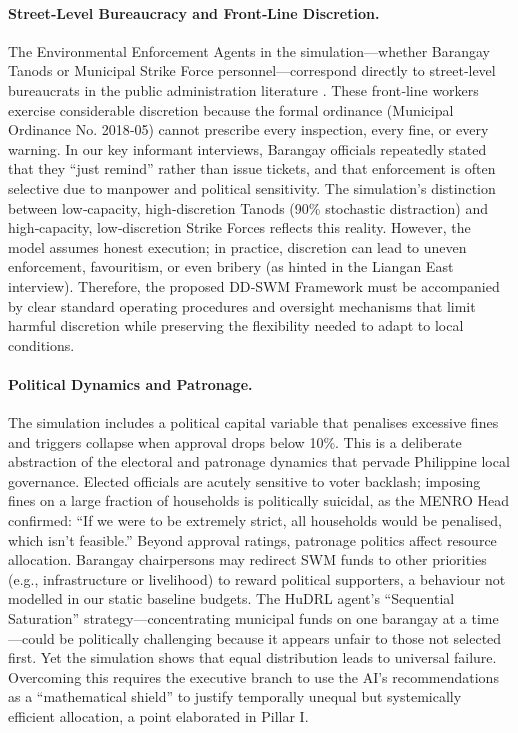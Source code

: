 \paragraph{Street‑Level Bureaucracy and Front‑Line Discretion.}
The Environmental Enforcement Agents in the simulation—whether Barangay Tanods or Municipal Strike Force personnel—correspond directly to street‑level bureaucrats in the public administration literature \citep{Lipsky1980}. These front‑line workers exercise considerable discretion because the formal ordinance (Municipal Ordinance No. 2018‑05) cannot prescribe every inspection, every fine, or every warning. In our key informant interviews, Barangay officials repeatedly stated that they “just remind” rather than issue tickets, and that enforcement is often selective due to manpower and political sensitivity. The simulation’s distinction between low‑capacity, high‑discretion Tanods (90\% stochastic distraction) and high‑capacity, low‑discretion Strike Forces reflects this reality. However, the model assumes honest execution; in practice, discretion can lead to uneven enforcement, favouritism, or even bribery (as hinted in the Liangan East interview). Therefore, the proposed DD‑SWM Framework must be accompanied by clear standard operating procedures and oversight mechanisms that limit harmful discretion while preserving the flexibility needed to adapt to local conditions.

\paragraph{Political Dynamics and Patronage.}
The simulation includes a political capital variable that penalises excessive fines and triggers collapse when approval drops below 10\%. This is a deliberate abstraction of the electoral and patronage dynamics that pervade Philippine local governance. Elected officials are acutely sensitive to voter backlash; imposing fines on a large fraction of households is politically suicidal, as the MENRO Head confirmed: “If we were to be extremely strict, all households would be penalised, which isn’t feasible.” Beyond approval ratings, patronage politics affect resource allocation. Barangay chairpersons may redirect SWM funds to other priorities (e.g., infrastructure or livelihood) to reward political supporters, a behaviour not modelled in our static baseline budgets. The HuDRL agent’s “Sequential Saturation” strategy—concentrating municipal funds on one barangay at a time—could be politically challenging because it appears unfair to those not selected first. Yet the simulation shows that equal distribution leads to universal failure. Overcoming this requires the executive branch to use the AI’s recommendations as a “mathematical shield” to justify temporally unequal but systemically efficient allocation, a point elaborated in Pillar I.

